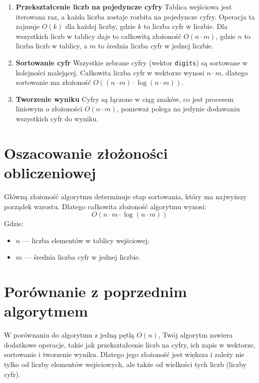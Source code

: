 \documentclass[a4paper,12pt]{article}
\begin{document}
	\begin{enumerate}
		\item \textbf{Przekształcenie liczb na pojedyncze cyfry}  
		Tablica wejściowa jest iterowana raz, a każda liczba zostaje rozbita na pojedyncze cyfry.  
		Operacja ta zajmuje \(O(k)\) dla każdej liczby, gdzie \(k\) to liczba cyfr w liczbie. Dla wszystkich liczb w tablicy daje to całkowitą złożoność \(O(n \cdot m)\), gdzie \(n\) to liczba liczb w tablicy, a \(m\) to średnia liczba cyfr w jednej liczbie.  
		
		\item \textbf{Sortowanie cyfr}  
		Wszystkie zebrane cyfry (wektor \texttt{digits}) są sortowane w kolejności malejącej.  
		Całkowita liczba cyfr w wektorze wynosi \(n \cdot m\), dlatego sortowanie ma złożoność \(O((n \cdot m) \cdot \log(n \cdot m))\).  
		
		\item \textbf{Tworzenie wyniku}  
		Cyfry są łączone w ciąg znaków, co jest procesem liniowym o złożoności \(O(n \cdot m)\), ponieważ polega na jedynie dodawaniu wszystkich cyfr do wyniku.
	\end{enumerate}
	
	\section*{Oszacowanie złożoności obliczeniowej}
	
	Główną złożoność algorytmu determinuje etap sortowania, który ma najwyższy porządek wzrostu. Dlatego całkowita złożoność algorytmu wynosi:
	\[
	O(n \cdot m \cdot \log(n \cdot m))
	\]
	Gdzie:
	\begin{itemize}
		\item \(n\) — liczba elementów w tablicy wejściowej;
		\item \(m\) — średnia liczba cyfr w jednej liczbie.
	\end{itemize}
	
	\section*{Porównanie z poprzednim algorytmem}
	
	W porównaniu do algorytmu z jedną pętlą \(O(n)\), Twój algorytm zawiera dodatkowe operacje, takie jak przekształcenie liczb na cyfry, ich zapis w wektorze, sortowanie i tworzenie wyniku. Dlatego jego złożoność jest większa i zależy nie tylko od liczby elementów wejściowych, ale także od wielkości tych liczb (liczby cyfr).
	
\end{document}
